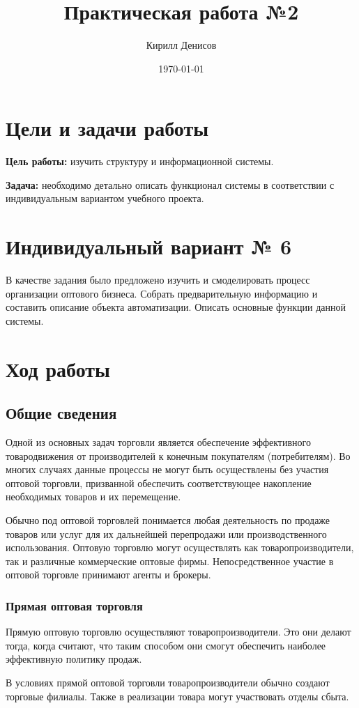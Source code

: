 \documentclass[a4paper,14pt]{extarticle}
\author{Кирилл Денисов}
\title{Практическая работа №2}
\date{\today}
\newcommand{\pathToCommonFolder}{/home/denilai/Documents/repos/latex/Common}
\begin{document}
	\thispagestyle{empty}
	
	\newpage
	\tableofcontents
	\newpage
	
\section{Цели и задачи работы}
\textbf{Цель работы: }изучить
структуру и
информационной системы.

\textbf{Задача: }
необходимо детально описать функционал системы в соответствии с
индивидуальным вариантом учебного проекта.

\section {Индивидуальный вариант № 6}
В качестве задания было предложено изучить и смоделировать процесс организации оптового бизнеса. Собрать предварительную информацию и составить описание объекта автоматизации. Описать основные функции данной системы.
\section{Ход работы}
\subsection{Общие сведения}
Одной из основных задач торговли является обеспечение эффективного товародвижения от производителей к конечным покупателям (потребителям). Во многих случаях данные процессы не могут быть осуществлены без участия оптовой торговли, призванной обеспечить соответствующее накопление необходимых товаров и их перемещение.

Обычно под оптовой торговлей понимается любая деятельность по продаже товаров или услуг для их дальнейшей перепродажи или производственного использования.
Оптовую торговлю могут осуществлять как товаропроизводители, так и различные коммерческие оптовые фирмы. Непосредственное участие в оптовой торговле принимают агенты и брокеры.
\subsubsection{Прямая оптовая торговля}
Прямую оптовую торговлю осуществляют товаропроизводители. Это они делают тогда, когда считают, что таким способом они смогут обеспечить наиболее эффективную политику продаж.

В условиях прямой оптовой торговли товаропроизводители обычно создают торговые филиалы. Также в реализации товара могут участвовать отделы сбыта.
\end{document}
